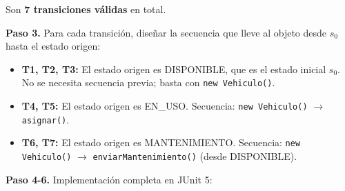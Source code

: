 Son \textbf{7 transiciones válidas} en total.

\textbf{Paso 3.} Para cada transición, diseñar la secuencia que lleve al objeto desde $s_0$ hasta el estado origen:

\begin{itemize}
    \item \textbf{T1, T2, T3:} El estado origen es DISPONIBLE, que es el estado inicial $s_0$. No se necesita secuencia previa; basta con \texttt{new Vehiculo()}.
    \item \textbf{T4, T5:} El estado origen es EN\_USO. Secuencia: \texttt{new Vehiculo()} $\rightarrow$ \texttt{asignar()}.
    \item \textbf{T6, T7:} El estado origen es MANTENIMIENTO. Secuencia: \texttt{new Vehiculo()} $\rightarrow$ \texttt{enviarMantenimiento()} (desde DISPONIBLE).
\end{itemize}

\textbf{Paso 4-6.} Implementación completa en JUnit 5:

